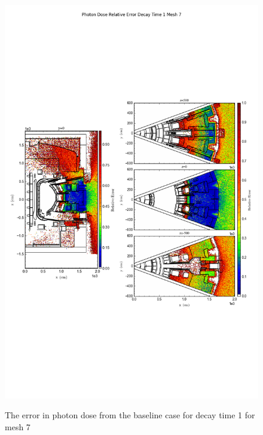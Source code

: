\begin{figure}[ht!]
\centering
\includegraphics[trim={0cm 9cm 0cm 10cm},clip,scale=0.75]{../plots/final_model/Photon_Dose_Relative_Error_Decay_Time_1_Mesh_7.png}
\label{fig:photons_dc1_no4bc_m7_error}
\caption{The error in photon dose from the baseline case for decay time 1 for mesh 7}
\end{figure}
